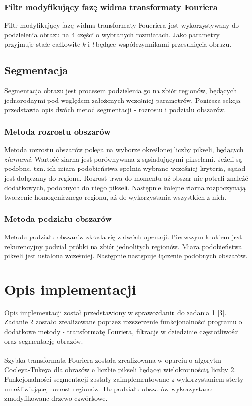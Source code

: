 \documentclass{classrep}
\begin{document}
\subsubsection{Filtr modyfikujący fazę widma transformaty Fouriera}
Filtr modyfikujący fazę widma transformaty Foueriera jest wykorzystywany do podzielenia obrazu na 4 części o wybranych rozmiarach. Jako parametry przyjmuje stałe całkowite \textit{k} i \textit{l} będące współczynnikami przesunięcia obrazu.

\subsection{Segmentacja}
Segmentacja obrazu jest procesem podzielenia go na zbiór regionów, będących jednorodnymi pod względem założonych wcześniej parametrów. Poniższa sekcja przedstawia opis dwóch metod segmentacji - rozrostu i podziału obszarów.

\subsubsection{Metoda rozrostu obszarów}
Metoda rozrostu obszarów polega na wyborze określonej liczby pikseli, będących \textit{ziarnami}. Wartość ziarna jest porównywana z sąsiadującymi pikselami. Jeżeli są podobne, tzn. ich miara podobieństwa spełnia wybrane wcześniej kryteria, sąsiad jest dołączany do regionu. Rozrost trwa do momentu aż obszar nie potrafi znaleźć dodatkowych, podobnych do niego pikseli. Następnie kolejne ziarna rozpoczynają tworzenie homogenicznego regionu, aż do wykorzystania wszystkich z nich. 

\subsubsection{Metoda podziału obszarów}
Metoda podziału obszarów składa się z dwóch operacji. Pierwszym krokiem jest rekurencyjny podział próbki na zbiór jednolitych regionów. Miara podobieństwa pikseli jest ustalona wcześniej. Następnie następuje łączenie podobnych obszarów.

\section{Opis implementacji}
Opis implementacji został przedstawiony w sprawozdaniu do zadania 1 [3]. Zadanie 2 zostało zrealizowane poprzez rozszerzenie funkcjonalności programu o dodatkowe metody - transformatę Fouriera, filtracje w dziedzinie częstotliwości oraz segmentację obrazów.\\
\\
\indent
Szybka transformata Fouriera została zrealizowana w oparciu o algorytm Cooleya-Tukeya dla obrazów o liczbie pikseli będącej wielokrotnością liczby 2. Funkcjonalności segmentacji zostały zaimplementowane z wykorzystaniem sterty umożliwiającej rozrost regionów. Do podziału obszarów wykorzystano zmodyfikowane drzewo czwórkowe.
\end{document}
